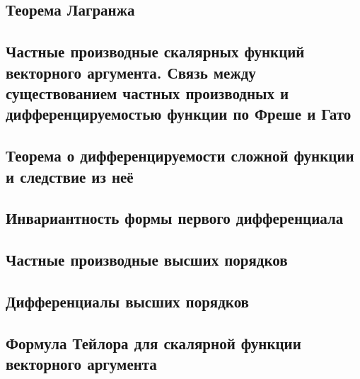 \subsection{Теорема Лагранжа}
\subsection{Частные производные скалярных функций векторного аргумента. Связь между существованием частных производных и дифференцируемостью функции по Фреше и Гато}
\subsection{Теорема о дифференцируемости сложной функции и следствие из неё}
\subsection{Инвариантность формы первого дифференциала}
\subsection{Частные производные высших порядков}
\subsection{Дифференциалы высших порядков}
\subsection{Формула Тейлора для скалярной функции векторного аргумента}


